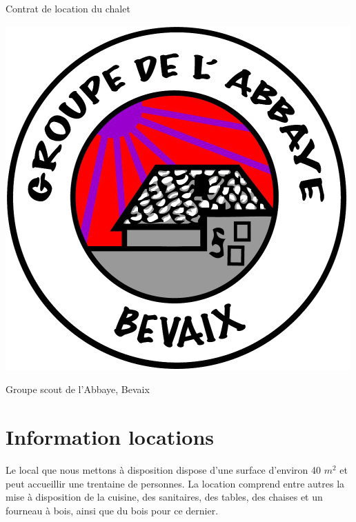 \documentclass[a4paper,12pt]{extarticle}
\begin{document}
\pagestyle{fancy}
\fancyhead{}
\fancyfoot{}
\fancyfoot[RO,RE]{\thepage}


\begin{titlepage}
    \begin{center}
        \Huge Contrat de location du chalet

        \vspace{3cm}
        \includegraphics{../../logos/Logo_Abbaye_500.png}
        \vspace{3cm}

        \huge Groupe scout de l'Abbaye, Bevaix 
    \end{center}
\end{titlepage}


\section{Information locations}

Le local que nous mettons à disposition dispose d'une surface d'environ 40 $m^2$ et peut accueillir une trentaine de personnes.
La location comprend entre autres la mise à disposition de la cuisine, des sanitaires, des tables, des chaises et un fourneau à bois, ainsi que du bois pour ce dernier.
\end{document}
